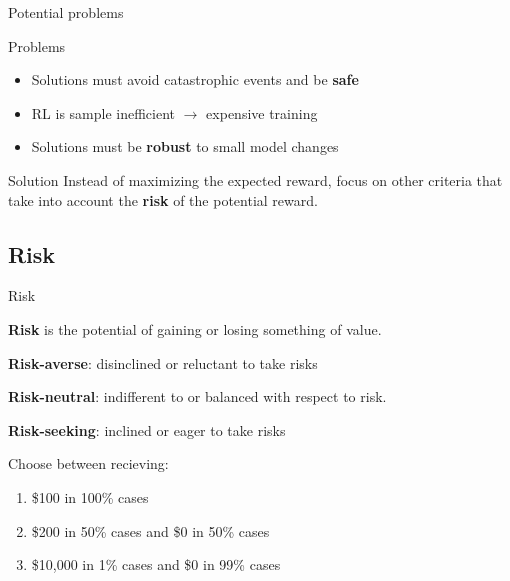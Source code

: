 \documentclass{beamer}
\begin{document}
\begin{frame}{Potential problems}

\begin{alertblock}{Problems}
\begin{itemize}
\item Solutions must avoid catastrophic events and be \textbf{safe}
\item RL is sample inefficient $\to$ expensive training
\item Solutions must be \textbf{robust} to small model changes
\end{itemize}
\end{alertblock}

\vspace{1cm}

\begin{exampleblock}{Solution}
Instead of maximizing the expected reward, focus on other criteria that take into account the \textbf{risk} of the potential reward.
\end{exampleblock}

\end{frame}


\subsection{Risk}

\begin{frame}{Risk}
\begin{definition}
\textbf{Risk} is the potential of gaining or losing something of value.

\vspace{3mm}
\textbf{Risk-averse}: disinclined or reluctant to take risks

\vspace{1mm}
\textbf{Risk-neutral}: indifferent to or balanced with respect to risk.

\vspace{1mm}
\textbf{Risk-seeking}: inclined or eager to take risks
\end{definition}



\begin{example}
Choose between recieving:
\begin{enumerate}
\item \$100 in 100\% cases
\item \$200 in 50\% cases and \$0 in 50\% cases
\item \$10,000 in 1\% cases and \$0 in 99\% cases
\end{enumerate}
\end{example}
\end{frame}
\end{document}
